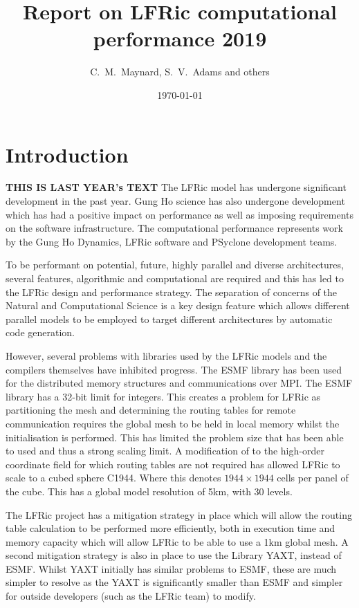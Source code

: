 \documentclass[11pt]{article}
\author{C.~M.~Maynard, S.~V.~Adams and others}
\title{Report on LFRic computational performance 2019}
\date{\today}
\begin{document}
\maketitle
\medskip
\section{Introduction\label{sec:intro}}
{\bf THIS IS LAST YEAR's TEXT}
The LFRic model has undergone significant development in the past
year. Gung Ho science has also undergone development which has had a
positive impact on performance as well as imposing requirements on the
software infrastructure. The computational performance represents work
by the Gung Ho Dynamics, LFRic software and PSyclone development teams.

To be performant on potential, future, highly
parallel and diverse architectures, several features, algorithmic and computational
are required and this has led to the LFRic design and performance
strategy. The separation of concerns of the Natural and Computational
Science is a key design feature which allows different parallel models
to be employed to target different architectures by automatic code generation.

However, several problems with libraries used by the LFRic models and
the compilers themselves have inhibited progress. The ESMF library has
been used for the distributed memory structures and communications
over MPI. The ESMF library has a 32-bit limit for integers. This
creates a problem for LFRic as partitioning the mesh and determining
the routing tables for remote communication requires the global mesh
to be held in local memory whilst the initialisation is
performed. This has limited the problem size that has been able to
used and thus a strong scaling limit. A modification of to the
high-order coordinate field for which routing tables are not required
has allowed LFRic to scale to a cubed sphere C1944. Where this denotes
$1944 \times 1944$ cells per panel of the cube. This has a global
model resolution of 5km, with 30 levels. 

The LFRic project has a mitigation strategy in place which will allow
the routing table calculation to be performed more efficiently, both
in execution time and memory capacity which will allow LFRic to be
able to use a 1km global mesh. A second mitigation strategy is also in
place to use the Library YAXT, instead of ESMF.  Whilst YAXT initially
has similar problems to ESMF, these are much simpler to resolve as the
YAXT is significantly smaller than ESMF and simpler for outside
developers (such as the LFRic team) to modify. 
\end{document}
